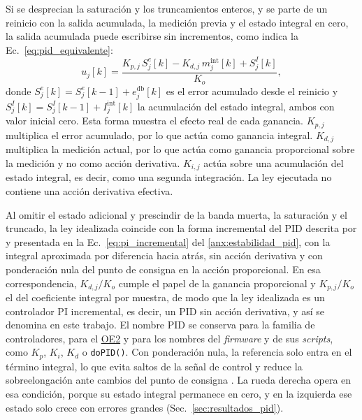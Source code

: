 Si se desprecian la saturación y los truncamientos enteros, y se parte de un
reinicio con la salida acumulada, la medición previa y el estado integral en
cero, la salida acumulada puede escribirse sin incrementos, como indica la
Ec.~\eqref{eq:pid_equivalente}:
\begin{equation}
u_j[k]=\frac{K_{p,j}\,S_j^{e}[k]-K_{d,j}\,m_j^{\mathrm{int}}[k]+S_j^{I}[k]}{K_o},
\label{eq:pid_equivalente}
\end{equation}
\noindent donde $S_j^{e}[k]=S_j^{e}[k-1]+e_j^{\mathrm{db}}[k]$ es el error
acumulado desde el reinicio y $S_j^{I}[k]=S_j^{I}[k-1]+I_j^{\mathrm{int}}[k]$
la acumulación del estado integral, ambos con valor inicial cero. Esta forma
muestra el efecto real de cada ganancia. $K_{p,j}$ multiplica el error
acumulado, por lo que actúa como ganancia integral. $K_{d,j}$ multiplica la
medición actual, por lo que actúa como ganancia proporcional sobre la medición
y no como acción derivativa. $K_{i,j}$ actúa sobre una acumulación del estado
integral, es decir, como una segunda integración. La ley ejecutada no contiene
una acción derivativa efectiva.

Al omitir el estado adicional y prescindir de la banda muerta, la saturación
y el truncado, la ley idealizada coincide con la forma
incremental del PID descrita por \citet[Sec.~13.4]{astrom2009controlpid} y
presentada en la Ec.~\eqref{eq:pi_incremental} del \ref{anx:estabilidad_pid},
con la integral aproximada por
diferencia hacia atrás, sin acción derivativa y con ponderación nula del punto
de consigna en la acción proporcional. En esa correspondencia, $K_{d,j}/K_o$
cumple el papel de la ganancia proporcional y $K_{p,j}/K_o$ el del coeficiente
integral por muestra, de modo que la ley idealizada es un controlador PI
incremental, es decir, un PID sin acción derivativa, y así se denomina en este
trabajo. El nombre PID se conserva para la familia de controladores, para el
\hyperref[oe2]{OE2} y para los nombres del \textit{firmware} y de sus
\textit{scripts}, como $K_p$, $K_i$, $K_d$ o \texttt{doPID()}. Con ponderación nula, la referencia solo
entra en el término integral, lo que evita saltos de la señal de control y
reduce la sobreelongación ante cambios del punto de consigna
\citep[Sec.~3.4]{astrom2009controlpid}. La rueda derecha opera en esa
condición, porque su estado integral permanece en cero, y en la izquierda ese
estado solo crece con errores grandes (Sec.~\ref{sec:resultados_pid}).

